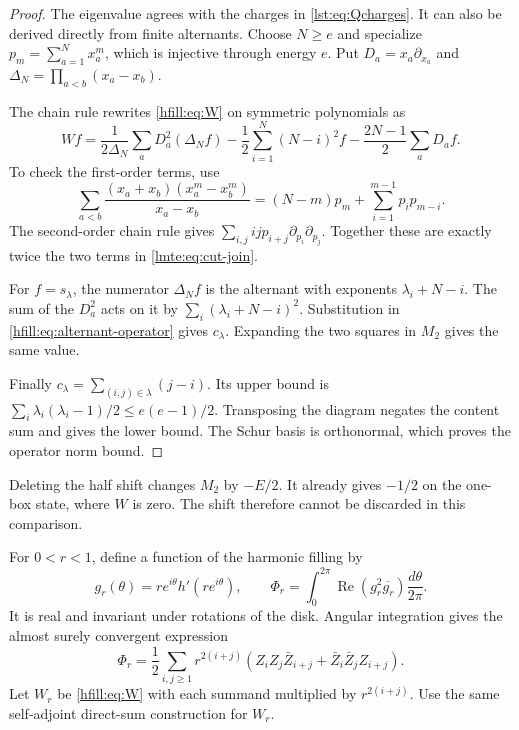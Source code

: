 \begin{proof}
The eigenvalue agrees with the charges in \eqref{lst:eq:Qcharges}.
It can also be derived directly from finite alternants.
Choose $N\geq e$ and specialize $p_m=\sum_{a=1}^N x_a^m$,
which is injective through energy $e$.
Put $D_a=x_a\partial_{x_a}$ and
$\Delta_N=\prod_{a<b}(x_a-x_b)$.

The chain rule rewrites \eqref{hfill:eq:W} on symmetric polynomials as
\begin{equation}\label{hfill:eq:alternant-operator}
 Wf=\frac1{2\Delta_N}\sum_aD_a^2(\Delta_N f)
      -\frac12\sum_{i=1}^N(N-i)^2f
      -\frac{2N-1}{2}\sum_aD_af.
\end{equation}
To check the first-order terms, use
\[
 \sum_{a<b}\frac{(x_a+x_b)(x_a^m-x_b^m)}{x_a-x_b}
 =(N-m)p_m+\sum_{i=1}^{m-1}p_ip_{m-i}.
\]
The second-order chain rule gives
$\sum_{i,j}ij p_{i+j}\partial_{p_i}\partial_{p_j}$.
Together these are exactly twice the two terms in
\eqref{lmte:eq:cut-join}.

For $f=s_\lambda$, the numerator $\Delta_Nf$ is the alternant
with exponents $\lambda_i+N-i$.
The sum of the $D_a^2$ acts on it by
$\sum_i(\lambda_i+N-i)^2$.
Substitution in \eqref{hfill:eq:alternant-operator} gives $c_\lambda$.
Expanding the two squares in $M_2$ gives the same value.

Finally $c_\lambda=\sum_{(i,j)\in\lambda}(j-i)$.
Its upper bound is
$\sum_i\lambda_i(\lambda_i-1)/2\leq e(e-1)/2$.
Transposing the diagram negates the content sum and gives the lower bound.
The Schur basis is orthonormal, which proves the operator norm bound.
\end{proof}

Deleting the half shift changes $M_2$ by $-E/2$.
It already gives $-1/2$ on the one-box state, where $W$ is zero.
The shift therefore cannot be discarded in this comparison.

For $0<r<1$, define a function of the harmonic filling by
\begin{equation}\label{hfill:eq:radial-observable}
 g_r(\theta)=re^{i\theta}h'(re^{i\theta}),
 \qquad
 \Phi_r=\int_0^{2\pi}
       \operatorname{Re}(g_r^2\overline{g_r})\frac{d\theta}{2\pi}.
\end{equation}
It is real and invariant under rotations of the disk.
Angular integration gives the almost surely convergent expression
\begin{equation}\label{hfill:eq:radial-symbol}
 \Phi_r=\frac12\sum_{i,j\geq1}r^{2(i+j)}
       \left(Z_iZ_j\bar Z_{i+j}
                     +\bar Z_i\bar Z_j Z_{i+j}\right).
\end{equation}
Let $W_r$ be \eqref{hfill:eq:W} with each summand multiplied by
$r^{2(i+j)}$.
Use the same self-adjoint direct-sum construction for $W_r$.


